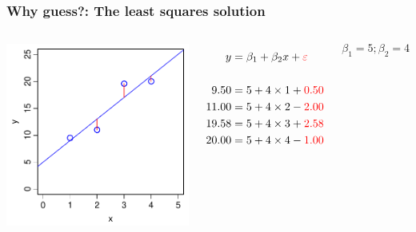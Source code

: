 \documentclass[aspectratio=43]{beamer}
\begin{document}
\frame
{\frametitle{Why guess?: The least squares solution}

\begin{columns}[T]

		\includegraphics[width=\textwidth]{JustRight.pdf}
		
		\begin{align*}
		  y  &= \beta_1 + \beta_2 x  + {\color{red} \varepsilon }\\
		  \\
		  9.50  &= 5 + 4 \times 1 + {\color{red} 0.50}\\
		  11.00 &= 5 + 4 \times 2 - {\color{red} 2.00}\\
		  19.58 &= 5 + 4 \times 3 + {\color{red} 2.58}\\
		  20.00 &= 5 + 4 \times 4 - {\color{red} 1.00} 
		\end{align*}
		
		\[\beta_1 = 5; \beta_2=4\]
				
\end{columns}		
}
\end{document}
